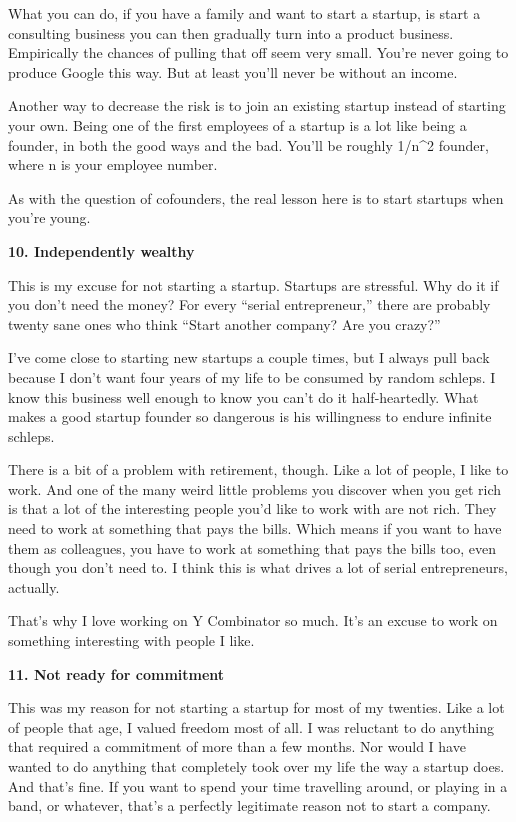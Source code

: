 What you can do, if you have a family and want to start a startup, is
start a consulting business you can then gradually turn into a product
business. Empirically the chances of pulling that off seem very small.
You're never going to produce Google this way. But at least you'll never
be without an income.

Another way to decrease the risk is to join an existing startup instead
of starting your own. Being one of the first employees of a startup is a
lot like being a founder, in both the good ways and the bad. You'll be
roughly 1/n\^{}2 founder, where n is your employee number.

As with the question of cofounders, the real lesson here is to start
startups when you're young.

\textbf{10. Independently wealthy}

This is my excuse for not starting a startup. Startups are stressful.
Why do it if you don't need the money? For every ``serial
entrepreneur,'' there are probably twenty sane ones who think ``Start
another company? Are you crazy?''

I've come close to starting new startups a couple times, but I always
pull back because I don't want four years of my life to be consumed by
random schleps. I know this business well enough to know you can't do it
half-heartedly. What makes a good startup founder so dangerous is his
willingness to endure infinite schleps.

There is a bit of a problem with retirement, though. Like a lot of
people, I like to work. And one of the many weird little problems you
discover when you get rich is that a lot of the interesting people you'd
like to work with are not rich. They need to work at something that pays
the bills. Which means if you want to have them as colleagues, you have
to work at something that pays the bills too, even though you don't need
to. I think this is what drives a lot of serial entrepreneurs, actually.

That's why I love working on Y Combinator so much. It's an excuse to
work on something interesting with people I like.

\textbf{11. Not ready for commitment}

This was my reason for not starting a startup for most of my twenties.
Like a lot of people that age, I valued freedom most of all. I was
reluctant to do anything that required a commitment of more than a few
months. Nor would I have wanted to do anything that completely took over
my life the way a startup does. And that's fine. If you want to spend
your time travelling around, or playing in a band, or whatever, that's a
perfectly legitimate reason not to start a company.

